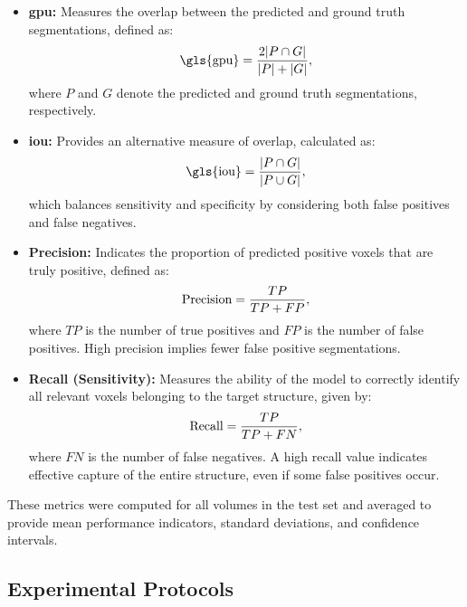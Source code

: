 \begin{itemize}
\item \textbf{\gls{gpu}:} Measures the overlap between the predicted and ground truth segmentations, defined as:
\begin{equation}
\addcontentsline{equ}{equations}{\protect\numberline{\theequation}Dice Coefficient}
\text{\gls{gpu}} = \frac{2|P \cap G|}{|P| + |G|},
\end{equation}
where $P$ and $G$ denote the predicted and ground truth segmentations, respectively.
\item \textbf{\gls{iou}:} Provides an alternative measure of overlap, calculated as:
\begin{equation}
\addcontentsline{equ}{equations}{\protect\numberline{\theequation}\gls{iou}}
\text{\gls{iou}} = \frac{|P \cap G|}{|P \cup G|},
\end{equation}
which balances sensitivity and specificity by considering both false positives and false negatives.
\item \textbf{Precision:} Indicates the proportion of predicted positive voxels that are truly positive, defined as:
\begin{equation}
\addcontentsline{equ}{equations}{\protect\numberline{\theequation}Precision}
\text{Precision} = \frac{TP}{TP + FP},
\end{equation}
where $TP$ is the number of true positives and $FP$ is the number of false positives. High precision implies fewer false positive segmentations.
\item \textbf{Recall (Sensitivity):} Measures the ability of the model to correctly identify all relevant voxels belonging to the target structure, given by:
\begin{equation}
\addcontentsline{equ}{equations}{\protect\numberline{\theequation}Recall}
\text{Recall} = \frac{TP}{TP + FN},
\end{equation}
where $FN$ is the number of false negatives. A high recall value indicates effective capture of the entire structure, even if some false positives occur.
\end{itemize}
These metrics were computed for all volumes in the test set and averaged to provide mean performance indicators, standard deviations, and confidence intervals.

\subsection{Experimental Protocols}

